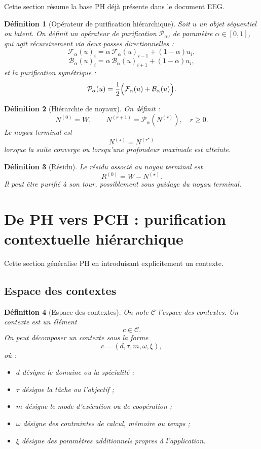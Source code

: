 \documentclass[11pt,a4paper]{article}
\newtheorem{definition}{Définition}[section]
\newcommand{\C}{\mathcal C}
\newcommand{\Pcal}{\mathcal P}
\newcommand{\1}{\mathbf 1}
\begin{document}
Cette section résume la base PH déjà présente dans le document EEG.

\begin{definition}[Opérateur de purification hiérarchique]
Soit \(u\) un objet séquentiel ou latent. On définit un opérateur de purification \(\Pcal_\alpha\), de paramètre \(\alpha\in[0,1]\), qui agit récursivement via deux passes directionnelles :
\[
\mathcal F_\alpha(u)_i
=
\alpha\,\mathcal F_\alpha(u)_{i-1}
+
(1-\alpha)u_i,
\]
\[
\mathcal B_\alpha(u)_i
=
\alpha\,\mathcal B_\alpha(u)_{i+1}
+
(1-\alpha)u_i,
\]
et la purification symétrique :
\[
\Pcal_\alpha(u)
=
\frac12\Bigl(\mathcal F_\alpha(u)+\mathcal B_\alpha(u)\Bigr).
\]
\end{definition}

\begin{definition}[Hiérarchie de noyaux]
On définit :
\[
N^{(0)} = W,
\qquad
N^{(r+1)} = \Pcal_\alpha\!\left(N^{(r)}\right),
\quad r\ge 0.
\]
Le noyau terminal est
\[
N^{(\star)} = N^{(r^\star)}
\]
lorsque la suite converge ou lorsqu'une profondeur maximale est atteinte.
\end{definition}

\begin{definition}[Résidu]
Le résidu associé au noyau terminal est
\[
R^{(0)} = W - N^{(\star)}.
\]
Il peut être purifié à son tour, possiblement sous guidage du noyau terminal.
\end{definition}

\section{De PH vers PCH : purification contextuelle hiérarchique}

Cette section généralise PH en introduisant explicitement un contexte.

\subsection{Espace des contextes}

\begin{definition}[Espace des contextes]
On note \(\C\) l'espace des contextes.
Un contexte est un élément
\[
c\in\C.
\]
On peut décomposer un contexte sous la forme
\[
c=(d,\tau,m,\omega,\xi),
\]
où :
\begin{itemize}[leftmargin=2em]
    \item \(d\) désigne le domaine ou la spécialité ;
    \item \(\tau\) désigne la tâche ou l'objectif ;
    \item \(m\) désigne le mode d'exécution ou de coopération ;
    \item \(\omega\) désigne des contraintes de calcul, mémoire ou temps ;
    \item \(\xi\) désigne des paramètres additionnels propres à l'application.
\end{itemize}
\end{definition}
\end{document}
